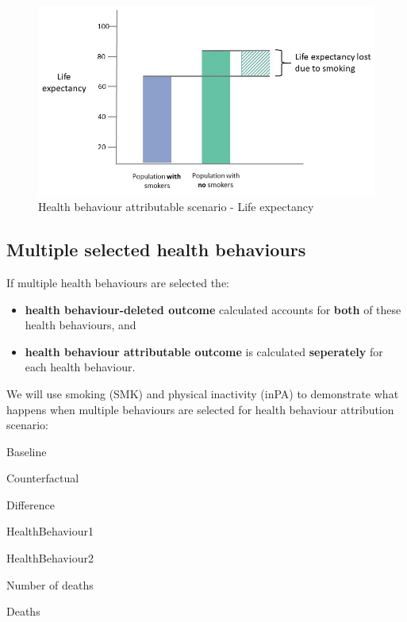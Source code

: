 \documentclass[]{book}
\providecommand{\tightlist}{%
  \setlength{\itemsep}{0pt}\setlength{\parskip}{0pt}}
\begin{document}
\begin{figure}

{\centering \includegraphics{Images/HB attributable LE} 

}

\caption{Health behaviour attributable scenario - Life expectancy}\label{fig:unnamed-chunk-14}
\end{figure}

\hypertarget{multiple-selected-health-behaviours}{%
\subsection{Multiple selected health behaviours}\label{multiple-selected-health-behaviours}}

If multiple health behaviours are selected the:

\begin{itemize}
\tightlist
\item
  \textbf{health behaviour-deleted outcome} calculated accounts for \textbf{both} of these health behaviours, and
\item
  \textbf{health behaviour attributable outcome} is calculated \textbf{seperately} for each health behaviour.
\end{itemize}

We will use smoking (SMK) and physical inactivity (inPA) to demonstrate what happens when multiple behaviours are selected for health behaviour attribution scenario:

Baseline

Counterfactual

Difference

HealthBehaviour1

HealthBehaviour2

Number of deaths

Deaths
\end{document}
